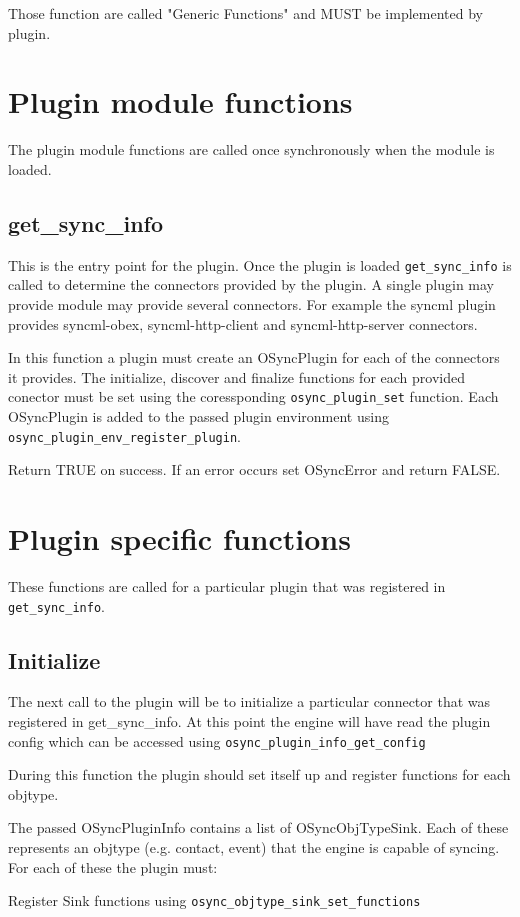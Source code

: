 Those function are called "Generic Functions" and MUST be implemented by 
plugin.

\section{Plugin module functions}
The plugin module functions are called once synchronously when the module
is loaded.
\subsection{get\_sync\_info}
This is the entry point for the plugin.  Once the plugin is loaded
\verb|get_sync_info| is called to determine the connectors provided by the
plugin. A single plugin may provide module may provide several connectors.  For
example the syncml plugin provides syncml-obex, syncml-http-client and
syncml-http-server connectors.

In this function a plugin must create an OSyncPlugin for each of the connectors
it provides.  The initialize, discover and finalize functions for each provided
conector must be set using the coressponding \verb|osync_plugin_set|
function. Each OSyncPlugin is added to the passed plugin environment using
\verb|osync_plugin_env_register_plugin|.

Return TRUE on success.  If an error occurs set OSyncError and return FALSE.
\section{Plugin specific functions}
These functions are called for a particular plugin that was registered in
\verb|get_sync_info|.
\subsection{Initialize}
The next call to the plugin will be to initialize a particular connector that
was registered in get\_sync\_info.  At this point the engine will have read the
plugin config which can be accessed using \verb|osync_plugin_info_get_config|

During this function the plugin should set itself up and register functions for each
objtype.

The passed OSyncPluginInfo contains a list of OSyncObjTypeSink.  Each of these
represents an objtype (e.g. contact, event) that the engine is capable of
syncing.  For each of these the plugin must:

Register Sink functions using \verb|osync_objtype_sink_set_functions|

